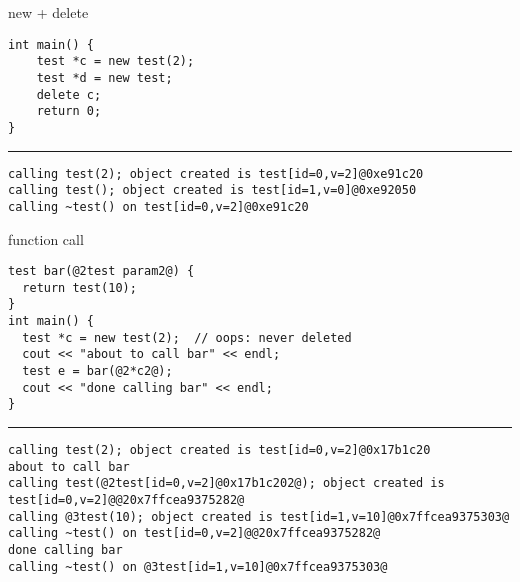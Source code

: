 \begin{frame}[fragile,label=testnewDel]{new + delete}
\begin{lstlisting}
int main() {
    test *c = new test(2);
    test *d = new test;
    delete c;
    return 0;
}
\end{lstlisting}
\hrule
{}
\begin{lstlisting}
calling test(2); object created is test[id=0,v=2]@0xe91c20
calling test(); object created is test[id=1,v=0]@0xe92050
calling ~test() on test[id=0,v=2]@0xe91c20
\end{lstlisting}
\end{frame}



\begin{frame}[fragile,label=testbar]{function call}
\begin{lstlisting}
test bar(@2test param2@) {
  return test(10);
}
int main() {
  test *c = new test(2);  // oops: never deleted
  cout << "about to call bar" << endl;
  test e = bar(@2*c2@);
  cout << "done calling bar" << endl;
}
\end{lstlisting}
\hrule
{}
\begin{lstlisting}
calling test(2); object created is test[id=0,v=2]@0x17b1c20
about to call bar
calling test(@2test[id=0,v=2]@0x17b1c202@); object created is test[id=0,v=2]@@20x7ffcea9375282@
calling @3test(10); object created is test[id=1,v=10]@0x7ffcea9375303@
calling ~test() on test[id=0,v=2]@@20x7ffcea9375282@
done calling bar
calling ~test() on @3test[id=1,v=10]@0x7ffcea9375303@
\end{lstlisting}
\end{frame}
